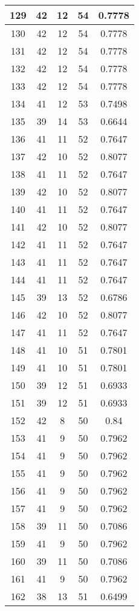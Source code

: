 \documentclass[letterpaper, 12pt]{article}
\begin{document}
\begin{longtable}{|c|c|c|c|c|}
\hline
129 & 42 & 12 & 54 & 0.7778 \\
\hline
130 & 42 & 12 & 54 & 0.7778 \\
\hline
131 & 42 & 12 & 54 & 0.7778 \\
\hline
132 & 42 & 12 & 54 & 0.7778 \\
\hline
133 & 42 & 12 & 54 & 0.7778 \\
\hline
134 & 41 & 12 & 53 & 0.7498 \\
\hline
135 & 39 & 14 & 53 & 0.6644 \\
\hline
136 & 41 & 11 & 52 & 0.7647 \\
\hline
137 & 42 & 10 & 52 & 0.8077 \\
\hline
138 & 41 & 11 & 52 & 0.7647 \\
\hline
139 & 42 & 10 & 52 & 0.8077 \\
\hline
140 & 41 & 11 & 52 & 0.7647 \\
\hline
141 & 42 & 10 & 52 & 0.8077 \\
\hline
142 & 41 & 11 & 52 & 0.7647 \\
\hline
143 & 41 & 11 & 52 & 0.7647 \\
\hline
144 & 41 & 11 & 52 & 0.7647 \\
\hline
145 & 39 & 13 & 52 & 0.6786 \\
\hline
146 & 42 & 10 & 52 & 0.8077 \\
\hline
147 & 41 & 11 & 52 & 0.7647 \\
\hline
148 & 41 & 10 & 51 & 0.7801 \\
\hline
149 & 41 & 10 & 51 & 0.7801 \\
\hline
150 & 39 & 12 & 51 & 0.6933 \\
\hline
151 & 39 & 12 & 51 & 0.6933 \\
\hline
152 & 42 & 8 & 50 & 0.84 \\
\hline
153 & 41 & 9 & 50 & 0.7962 \\
\hline
154 & 41 & 9 & 50 & 0.7962 \\
\hline
155 & 41 & 9 & 50 & 0.7962 \\
\hline
156 & 41 & 9 & 50 & 0.7962 \\
\hline
157 & 41 & 9 & 50 & 0.7962 \\
\hline
158 & 39 & 11 & 50 & 0.7086 \\
\hline
159 & 41 & 9 & 50 & 0.7962 \\
\hline
160 & 39 & 11 & 50 & 0.7086 \\
\hline
161 & 41 & 9 & 50 & 0.7962 \\
\hline
162 & 38 & 13 & 51 & 0.6499 \\

\end{longtable}
\end{document}
